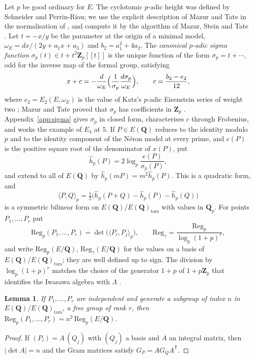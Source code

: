 \documentclass[11pt]{amsart}
\newtheorem{lemma}[theorem]{Lemma}
\theoremstyle{definition}
\newcommand{\Q}{\mathbf{Q}}
\newcommand{\Zp}{\mathbf{Z}_p}
\newcommand{\Qp}{\mathbf{Q}_p}
\newcommand{\Reg}{\mathrm{Reg}}
\newcommand{\tors}{\mathrm{tors}}
\begin{document}
Let $p$ be good ordinary for $E$. The cyclotomic $p$-adic height was defined by Schneider \cite{Sch82} and Perrin-Riou; we use the explicit description of Mazur and Tate \cite{MT91} in the normalisation of \cite[\S4]{SW13}, and compute it by the algorithm of Mazur, Stein and Tate \cite{MST06}. Let $t=-x/y$ be the parameter at the origin of a minimal model, $\omega_E=dx/(2y+a_1x+a_3)$ and $b_2=a_1^2+4a_2$. The \emph{canonical $p$-adic sigma function} $\sigma_p(t)\in t+t^2\Zp[[t]]$ is the unique function of the form $\sigma_p=t+\cdots$, odd for the inverse map of the formal group, satisfying
\[
x+c=-\frac{d}{\omega_E}\Bigl(\frac{1}{\sigma_p}\frac{d\sigma_p}{\omega_E}\Bigr),\qquad c=\frac{b_2-e_2}{12},
\]
where $e_2=E_2(E,\omega_E)$ is the value of Katz's $p$-adic Eisenstein series of weight two \cite{Kat76}; Mazur and Tate proved that $\sigma_p$ has coefficients in $\Zp$ \cite{MT91}. Appendix~\ref{app:sigma} gives $\sigma_p$ in closed form, characterises $c$ through Frobenius, and works the example of $E_4$ at $5$. If $P\in E(\Q)$ reduces to the identity modulo $p$ and to the identity component of the N\'eron model at every prime, and $e(P)$ is the positive square root of the denominator of $x(P)$, put
\[
\hat h_p(P)=2\log_p\frac{e(P)}{\sigma_p(P)} ,
\]
and extend to all of $E(\Q)$ by $\hat h_p(mP)=m^2\hat h_p(P)$. This is a quadratic form, and
\[
\langle P,Q\rangle_p=\tfrac12\bigl(\hat h_p(P+Q)-\hat h_p(P)-\hat h_p(Q)\bigr)
\]
is a symmetric bilinear form on $E(\Q)/E(\Q)_\tors$ with values in $\Qp$. For points $P_1,\dots,P_r$ put
\[
\Reg_p(P_1,\dots,P_r)=\det\bigl(\langle P_i,P_j\rangle_p\bigr),\qquad\Reg_\gamma=\frac{\Reg_p}{\log_p(1+p)^r},
\]
and write $\Reg_p(E/\Q)$, $\Reg_\gamma(E/\Q)$ for the values on a basis of $E(\Q)/E(\Q)_\tors$; they are well defined up to sign. The division by $\log_p(1+p)^r$ matches the choice of the generator $1+p$ of $1+p\Zp$ that identifies the Iwasawa algebra with $\Lambda$ \cite[\S4.4]{SW13}.

\begin{lemma}\label{lem:index}
If $P_1,\dots,P_r$ are independent and generate a subgroup of index $n$ in $E(\Q)/E(\Q)_\tors$, a free group of rank $r$, then $\Reg_p(P_1,\dots,P_r)=n^2\,\Reg_p(E/\Q)$.
\end{lemma}

\begin{proof}
If $(P_i)=A\,(Q_j)$ with $(Q_j)$ a basis and $A$ an integral matrix, then $|\det A|=n$ and the Gram matrices satisfy $G_P=AG_QA^{\mathsf T}$.
\end{proof}
\end{document}
